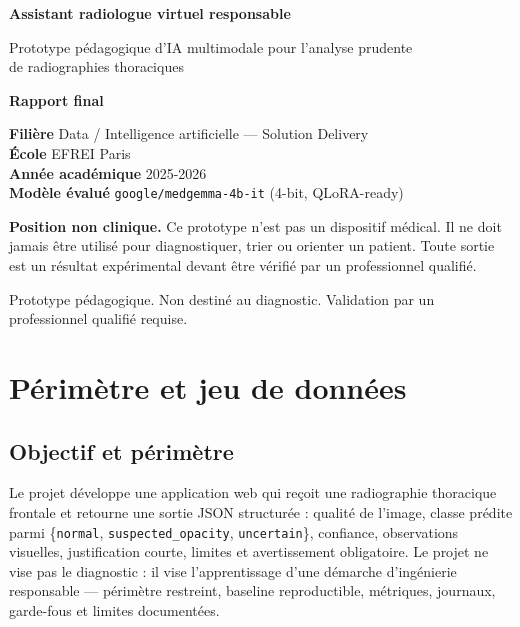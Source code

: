 \documentclass[11pt,a4paper]{article}
\begin{document}
\begin{titlepage}
\centering
\vspace*{2cm}
{\color{primary}\Huge\bfseries Assistant radiologue virtuel responsable\par}
\vspace{0.6cm}
{\Large Prototype pédagogique d'IA multimodale pour l'analyse prudente\\de radiographies thoraciques\par}
\vspace{1.5cm}
{\large\bfseries Rapport final\par}
\vspace{2cm}
\begin{keybox}
\centering
\textbf{Filière} Data / Intelligence artificielle --- Solution Delivery\\[4pt]
\textbf{École} EFREI Paris\\[4pt]
\textbf{Année académique} 2025-2026\\[4pt]
\textbf{Modèle évalué} \texttt{google/medgemma-4b-it} (4-bit, QLoRA-ready)
\end{keybox}
\vspace{1.5cm}
\begin{warnbox}
\centering\small
\textbf{Position non clinique.} Ce prototype n'est pas un dispositif médical. Il ne doit jamais
être utilisé pour diagnostiquer, trier ou orienter un patient. Toute sortie est un résultat
expérimental devant être vérifié par un professionnel qualifié.
\end{warnbox}
\vfill
{\small Prototype pédagogique. Non destiné au diagnostic. Validation par un professionnel qualifié requise.\par}
\end{titlepage}

\tableofcontents
\newpage

\section{Périmètre et jeu de données}

\subsection{Objectif et périmètre}
Le projet développe une application web qui reçoit une radiographie thoracique frontale et
retourne une sortie JSON structurée : qualité de l'image, classe prédite parmi
\{\texttt{normal}, \texttt{suspected\_opacity}, \texttt{uncertain}\}, confiance, observations
visuelles, justification courte, limites et avertissement obligatoire. Le projet ne vise pas le
diagnostic : il vise l'apprentissage d'une démarche d'ingénierie responsable --- périmètre
restreint, baseline reproductible, métriques, journaux, garde-fous et limites documentées.
\end{document}
